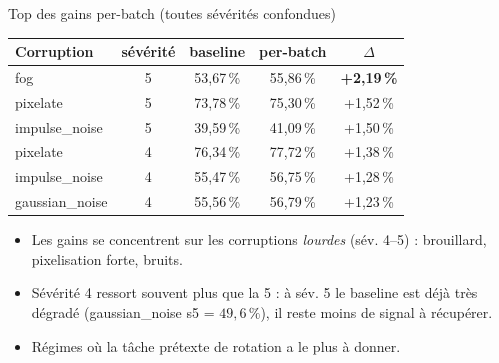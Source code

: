 \documentclass[10pt,aspectratio=169]{beamer}
\newcommand{\good}[1]{\textcolor{green!50!black}{#1}}
\begin{document}
\begin{frame}{Top des gains per-batch (toutes sévérités confondues)}
  \centering
  \begin{tabular}{lcccc}
    \toprule
    Corruption & sévérité & baseline & per-batch & $\Delta$ \\
    \midrule
    fog            & 5 & 53,67\,\% & 55,86\,\% & \good{\textbf{+2,19\,\%}} \\
    pixelate       & 5 & 73,78\,\% & 75,30\,\% & \good{+1,52\,\%} \\
    impulse\_noise & 5 & 39,59\,\% & 41,09\,\% & \good{+1,50\,\%} \\
    pixelate       & 4 & 76,34\,\% & 77,72\,\% & \good{+1,38\,\%} \\
    impulse\_noise & 4 & 55,47\,\% & 56,75\,\% & \good{+1,28\,\%} \\
    gaussian\_noise & 4 & 55,56\,\% & 56,79\,\% & \good{+1,23\,\%} \\
    \bottomrule
  \end{tabular}

  \vspace{0.7em}
  \begin{itemize}
    \item Les gains se concentrent sur les corruptions \emph{lourdes} (sév. 4--5) : brouillard, pixelisation forte, bruits.
    \item Sévérité 4 ressort souvent plus que la 5 : à sév. 5 le baseline est déjà très dégradé (gaussian\_noise s5 = $49{,}6\,\%$), il reste moins de signal à récupérer.
    \item Régimes où la tâche prétexte de rotation a le plus à donner.
  \end{itemize}
\end{frame}
\end{document}

